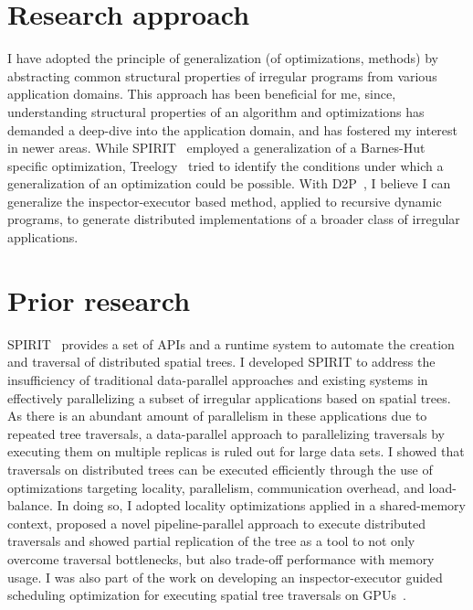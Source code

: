 \section*{Research approach} I have adopted the principle of generalization (of optimizations, methods) by abstracting common structural properties of irregular programs from various application domains. 
This approach has been beneficial for me, since, understanding structural properties of an algorithm and optimizations has demanded a deep-dive into the application domain, and has fostered my interest in newer areas. 
While SPIRIT~\cite{hegde17ics} employed a generalization of a Barnes-Hut specific optimization, Treelogy~\cite{hegde17ispass} tried to identify the conditions under which a generalization of an optimization could be possible.
With D2P~\cite{hegde19d2p}, I believe I can generalize the inspector-executor based method, applied to recursive dynamic programs, to generate distributed implementations of a broader class of irregular applications.  
    
\section*{Prior research}
SPIRIT~\cite{hegde17ics} provides a set of APIs and a runtime system to automate the creation and traversal of distributed spatial trees.
I developed SPIRIT to address the insufficiency of traditional data-parallel approaches and existing systems in effectively parallelizing a subset of irregular applications based on spatial trees.
As there is an abundant amount of parallelism in these applications due to repeated tree traversals, a data-parallel approach to parallelizing traversals by executing them on multiple replicas is ruled out for large data sets.
I showed that traversals on distributed trees can be executed efficiently through the use of optimizations targeting locality, parallelism, communication overhead, and load-balance.  
In doing so, I adopted locality optimizations %
applied in a shared-memory context, proposed a novel pipeline-parallel approach to execute distributed traversals and showed partial replication of the tree as a tool to not only overcome traversal bottlenecks, but also trade-off performance with memory usage.
I was also part of the work on developing an inspector-executor guided scheduling optimization for executing spatial tree traversals on GPUs~\cite{ics16liu}.

